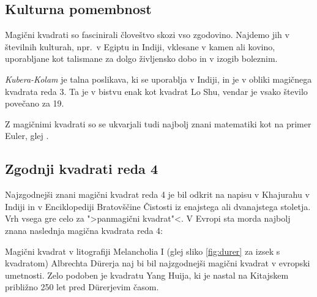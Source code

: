 \documentclass[a4paper,12pt]{article}
\theoremstyle{plain}
\theoremstyle{definition}
\newcommand{\pojem}[1]{\emph{\color{purple}#1}}
\begin{document}


\subsection{Kulturna pomembnost}

Magični kvadrati so fascinirali človeštvo skozi vso zgodovino. Najdemo jih
v številnih kulturah, npr.\ v Egiptu in Indiji, vklesane v kamen ali
kovino, uporabljane kot talismane za dolgo življensko dobo in v
izogib boleznim.

\pojem{Kubera-Kolam} je talna poslikava, ki se uporablja v Indiji, in je v
obliki magičnega kvadrata reda 3. Ta je v bistvu enak kot kvadrat
Lo Shu, vendar je vsako število povečano za 19.


Z magičnimi kvadrati so se ukvarjali tudi najbolj znani matematiki kot na
primer Euler, glej \cite{euler}. %


\subsection{Zgodnji kvadrati reda 4}

Najzgodnejši znani magični kvadrat reda 4 je bil odkrit na napisu
v Khajurahu v Indiji in v Enciklopediji Bratovščine Čistosti iz enajstega
ali dvanajstega stoletja. Vrh vsega gre celo za ">panmagični kvadrat"<.
V Evropi sta morda najbolj znana naslednja magična kvadrata reda 4:

Magični kvadrat v litografiji Melancholia I (glej sliko \ref{fig:durer}
za izsek s kvadratom) Albrechta Dürerja naj bi bil najzgodnejši magični kvadrat
v evropski umetnosti. Zelo podoben je kvadratu Yang Huija, ki je nastal na Kitajskem
približno 250 let pred Dürerjevim časom. %
\end{document}
